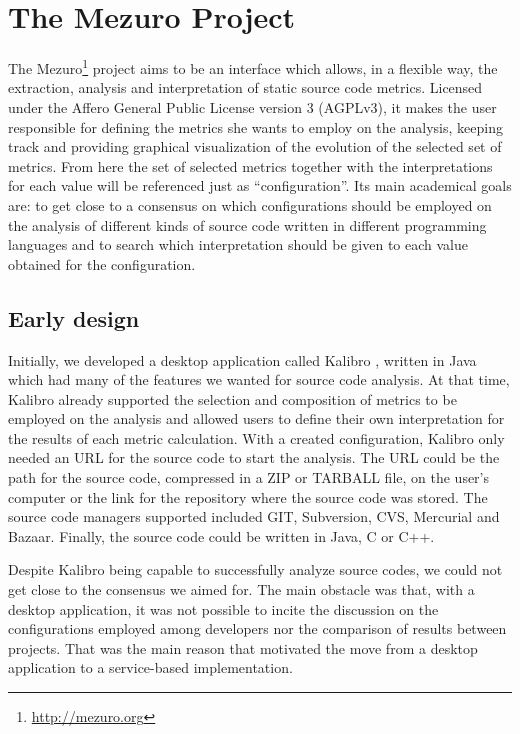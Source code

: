 \newpage
\section{The Mezuro Project}
\label{sec:mezuro}

The Mezuro\footnote{\url{http://mezuro.org}} project aims to be an interface which allows, in a flexible way, the extraction, analysis and interpretation of static source code metrics. Licensed under the Affero General Public License version 3 (AGPLv3), it makes the user responsible for defining the metrics she wants to employ on the analysis, keeping track and providing graphical visualization of the evolution of the selected set of metrics. From here the set of selected metrics together with the interpretations for each value  will be referenced just as ``configuration''. Its main academical goals are: to get close to a consensus on which configurations should be employed on the analysis of different kinds of source code written in different programming languages and to search which interpretation should be given to each value obtained for the configuration.

\subsection{Early design}
\label{subsec:early-design}

Initially, we developed a desktop application called Kalibro \cite{de2013kalibro}, written in Java which had many of the features we wanted for source code analysis. At that time, Kalibro already supported the selection and composition of metrics to be employed on the analysis and allowed users to define their own interpretation for the results of each metric calculation. With a created configuration, Kalibro only needed an URL for the source code to start the analysis. The URL could be the path for the source code, compressed in a ZIP or TARBALL file, on the user's computer or the link for the repository where the source code was stored. The source code managers supported included GIT, Subversion, CVS, Mercurial and Bazaar. Finally, the source code could be written in Java, C or C++.

Despite Kalibro being capable to successfully analyze source codes, we could not get close to the consensus we aimed for. The main obstacle was that, with a desktop application, it was not possible to incite the discussion on the configurations employed among developers nor the comparison of results between projects. That was the main reason that motivated the move from a desktop application to a service-based implementation.

